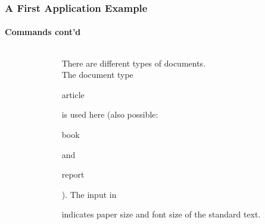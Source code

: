 \begin{frame}
\frametitle{A First Application Example}
\framesubtitle{Commands cont'd}
\begin{columns}
\begin{column}{0.6\textwidth}
\begin{ttfamily}\scriptsize

\end{ttfamily}
\end{column}

\begin{column}{0.4\textwidth}
There are different types of documents.\\ The document type
\begin{ttfamily}article\end{ttfamily} is used here (also possible:
\begin{ttfamily}book\end{ttfamily} and \begin{ttfamily}report\end{ttfamily}). The input in
\begin{ttfamily}[]\end{ttfamily} indicates paper size and font size of the
standard text.\\
\end{column}
\end{columns}
\end{frame}

